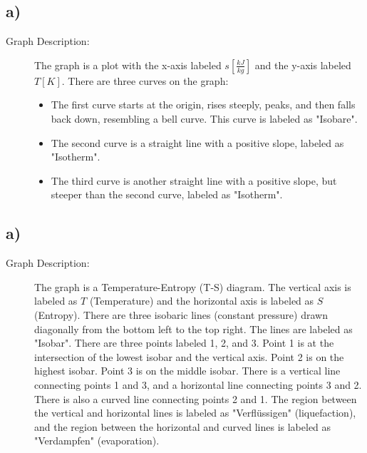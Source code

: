 

\subsection*{a)}

\begin{description}
    \item[Graph Description:] The graph is a plot with the x-axis labeled \( s \left[ \frac{kJ}{kg} \right] \) and the y-axis labeled \( T [K] \). There are three curves on the graph:
    \begin{itemize}
        \item The first curve starts at the origin, rises steeply, peaks, and then falls back down, resembling a bell curve. This curve is labeled as "Isobare".
        \item The second curve is a straight line with a positive slope, labeled as "Isotherm".
        \item The third curve is another straight line with a positive slope, but steeper than the second curve, labeled as "Isotherm".
    \end{itemize}
\end{description}



\subsection*{a)}

\begin{description}
    \item[Graph Description:] The graph is a Temperature-Entropy (T-S) diagram. The vertical axis is labeled as $T$ (Temperature) and the horizontal axis is labeled as $S$ (Entropy). There are three isobaric lines (constant pressure) drawn diagonally from the bottom left to the top right. The lines are labeled as "Isobar". There are three points labeled 1, 2, and 3. Point 1 is at the intersection of the lowest isobar and the vertical axis. Point 2 is on the highest isobar. Point 3 is on the middle isobar. There is a vertical line connecting points 1 and 3, and a horizontal line connecting points 3 and 2. There is also a curved line connecting points 2 and 1. The region between the vertical and horizontal lines is labeled as "Verflüssigen" (liquefaction), and the region between the horizontal and curved lines is labeled as "Verdampfen" (evaporation).
\end{description}

